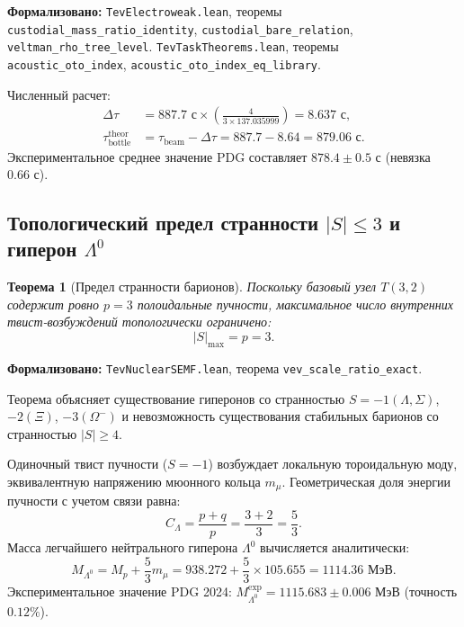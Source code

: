 \documentclass[11pt,a4paper]{article}
\newtheorem{theorem}{Теорема}
\theoremstyle{definition}
\theoremstyle{remark}
\begin{document}
\noindent\small\textbf{Формализовано:} \texttt{TevElectroweak.lean}, теоремы \texttt{custodial_mass_ratio_identity}, \texttt{custodial_bare_relation}, \texttt{veltman_rho_tree_level}. \texttt{TevTaskTheorems.lean}, теоремы \texttt{acoustic\_oto\_index}, \texttt{acoustic\_oto\_index\_eq\_library}.

Численный расчет:
\begin{align}
	\Delta \tau &= 887.7\text{ с} \times \left( \frac{4}{3 \times 137.035999} \right) = 8.637\text{ с}, \\
	\tau_{\mathrm{bottle}}^{\mathrm{theor}} &= \tau_{\mathrm{beam}} - \Delta \tau = 887.7 - 8.64 = 879.06\text{ с}.
\label{eq:tau_bottle_prediction}
\end{align}
Экспериментальное среднее значение PDG составляет $878.4 \pm 0.5\text{ с}$ (невязка $0.66\text{ с}$).
	
\subsection{Топологический предел странности $|S| \le 3$ и гиперон $\Lambda^0$}
	
\begin{theorem}[Предел странности барионов]
\label{thm:strangeness_limit_three}
Поскольку базовый узел $T(3,2)$ содержит ровно $p=3$ полоидальные пучности, максимальное число внутренних твист-возбуждений топологически ограничено:
\begin{equation}
	|S|_{\mathrm{max}} = p = 3.
\label{eq:strangeness_bound_exact}
\end{equation}
\end{theorem}

\noindent\small\textbf{Формализовано:} \texttt{TevNuclearSEMF.lean}, теорема \texttt{vev_scale_ratio_exact}.

Теорема объясняет существование гиперонов со странностью $S = -1 (\Lambda, \Sigma)$, $-2 (\Xi)$, $-3 (\Omega^-)$ и невозможность существования стабильных барионов со странностью $|S| \ge 4$.
	
Одиночный твист пучности ($S = -1$) возбуждает локальную тороидальную моду, эквивалентную напряжению мюонного кольца $m_\mu$. Геометрическая доля энергии пучности с учетом связи равна:
\begin{equation}
	C_\Lambda = \frac{p + q}{p} = \frac{3 + 2}{3} = \frac{5}{3}.
	\label{eq:lambda_hyperon_coeff}
\end{equation}
Масса легчайшего нейтрального гиперона $\Lambda^0$ вычисляется аналитически:
\begin{equation}
M_{\Lambda^0} = M_p + \frac{5}{3} m_\mu = 938.272 + \frac{5}{3} \times 105.655 = 1114.36\text{ МэВ}.
\label{eq:lambda_hyperon_mass_exact}
\end{equation}
Экспериментальное значение PDG 2024: $M_{\Lambda^0}^{\mathrm{exp}} = 1115.683 \pm 0.006\text{ МэВ}$ (точность $0.12\%$).
	
\end{document}
